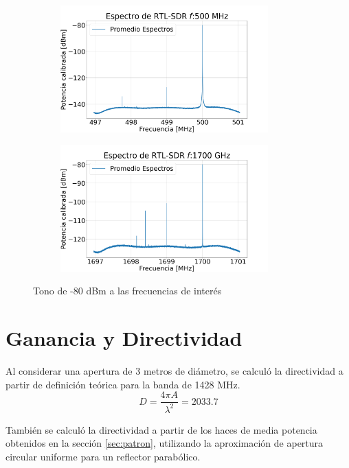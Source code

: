 \begin{figure}
\begin{subfigure}[b]{8cm}
    \end{subfigure}
    \hfill
    \begin{subfigure}[b]{8cm}
        \centering
        \includegraphics[width=8cm]{img/rtl500}
    \end{subfigure}
    \hfill
    \begin{subfigure}[b]{8cm}
        \centering
        \includegraphics[width=8cm]{img/rtl1700}
    \end{subfigure}
       \caption{Tono de -80 dBm a las frecuencias de interés}
       \label{fig:rtl_specs}
\end{figure}

\section{Ganancia y Directividad}

Al considerar una apertura de 3 metros de diámetro, se calculó la directividad a partir de definición teórica para la banda de 1428 MHz.\\

\begin{equation}
    D = \frac{4\pi A}{\lambda^2} = 2033.7
\end{equation}

También se calculó la directividad a partir de los haces de media potencia obtenidos en la sección \ref{sec:patron}, utilizando la aproximación de apertura circular uniforme para un reflector parabólico.\\

